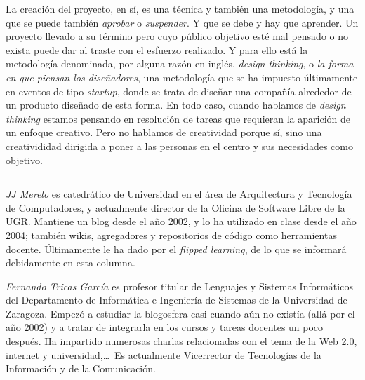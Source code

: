 \documentclass[twoside,10pt]{article}
\newcounter{num}
\begin{document}
\begin{multicols}{2}
La creación del proyecto, en sí, es una técnica y también una metodología, y
una que se puede también {\em aprobar} o {\em suspender}. Y que se
debe y hay que aprender. Un proyecto llevado a
su término pero cuyo público objetivo esté mal pensado o no exista puede dar al
traste con el esfuerzo realizado. Y para ello está la metodología denominada,
por alguna razón en inglés, {\sl design thinking}, o {\em la forma en que
  piensan los diseñadores}, una metodología que se ha impuesto
últimamente en eventos de tipo {\sl startup}, donde se trata de
diseñar una compañía alrededor de un producto diseñado de esta forma.
En todo caso, cuando hablamos de {\sl design thinking} estamos
pensando en resolución de tareas que requieran la aparición de un
enfoque creativo. Pero no hablamos de creatividad porque sí, sino una
creativididad dirigida a poner a las personas en el centro y sus necesidades como
objetivo. 

\noindent\rule{86mm}{1pt}
\vspace{1ex} {\small{\begin{window} 
\noindent\emph{JJ Merelo} es catedrático de Universidad
en el área de Arquitectura y Tecnología de Computadores, y
actualmente director de la Oficina de Software Libre de la UGR.
Mantiene un blog desde el año 2002, y lo ha utilizado en clase desde
el año 2004; también wikis, agregadores y repositorios de código
como herramientas docente. Últimamente le ha dado por el \textsl{flipped
learning}, de lo que se informará debidamente en esta columna.
\end{window}}}

\medskip

{\small{\begin{window}
		\noindent \emph{Fernando Tricas García} es profesor
		titular de Lenguajes y Sistemas Informáticos del Departamento
		de Informática e Ingeniería de Sistemas de la Universidad de
		Zaragoza.  Empezó a estudiar la blogosfera casi cuando aún no
		existía (allá por el año 2002) y a tratar de integrarla en los
		cursos y tareas docentes un poco después.  Ha impartido
		numerosas charlas relacionadas con el tema de la Web 2.0, 
		internet y universidad,\ldots\ 
		Es actualmente Vicerrector de Tecnologías de la Información y
de la Comunicación.   
		\end{window}}}


\end{multicols}
\end{document}

